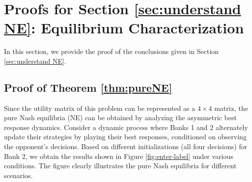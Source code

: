\section{Proofs for Section \ref{sec:understand NE}: Equilibrium Characterization}
In this section, we provide the proof of the conclusions given in Section \ref{sec:understand NE}.


\subsection{Proof of Theorem \ref{thm:pureNE}}
\label{proof:Theorem:pure:NE}
Since the utility matrix of this problem can be represented as a \(4 \times 4\) matrix, the pure Nash equilibria (NE) can be obtained by analyzing the asymmetric best response dynamics. Consider a dynamic process where Banks 1 and 2 alternately update their strategies by playing their best responses, conditioned on observing the opponent's decisions. Based on different initializations (all four decisions) for Bank 2, we obtain the results shown in Figure \ref{fig:enter-label} under various conditions. The figure clearly illustrates the pure Nash equilibria for different scenarios.


